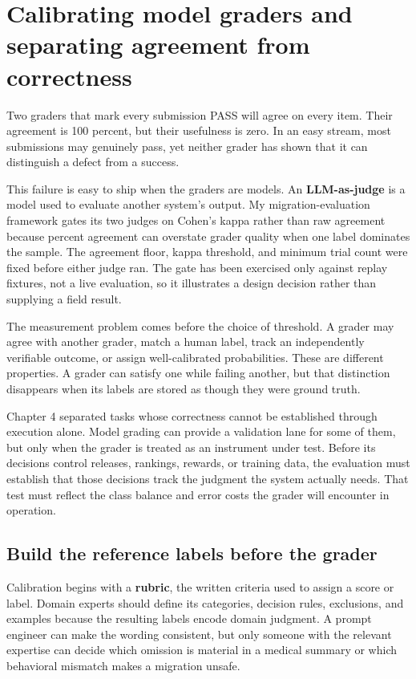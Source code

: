\chapter{Calibrating model graders and separating agreement from correctness}
\label{ch05-calibrating-model-graders-agreement-correctness}
Two graders that mark every submission PASS will agree on every item. Their agreement is 100 percent, but their usefulness is zero. In an easy stream, most submissions may genuinely pass, yet neither grader has shown that it can distinguish a defect from a success.

This failure is easy to ship when the graders are models. An \textbf{LLM-as-judge} is a model used to evaluate another system's output. My migration-evaluation framework gates its two judges on Cohen's kappa rather than raw agreement because percent agreement can overstate grader quality when one label dominates the sample. The agreement floor, kappa threshold, and minimum trial count were fixed before either judge ran. The gate has been exercised only against replay fixtures, not a live evaluation, so it illustrates a design decision rather than supplying a field result.

The measurement problem comes before the choice of threshold. A grader may agree with another grader, match a human label, track an independently verifiable outcome, or assign well-calibrated probabilities. These are different properties. A grader can satisfy one while failing another, but that distinction disappears when its labels are stored as though they were ground truth.

Chapter 4 separated tasks whose correctness cannot be established through execution alone. Model grading can provide a validation lane for some of them, but only when the grader is treated as an instrument under test. Before its decisions control releases, rankings, rewards, or training data, the evaluation must establish that those decisions track the judgment the system actually needs. That test must reflect the class balance and error costs the grader will encounter in operation.

\section{Build the reference labels before the grader}\label{build-the-reference-labels-before-the-grader}

Calibration begins with a \textbf{rubric}, the written criteria used to assign a score or label. Domain experts should define its categories, decision rules, exclusions, and examples because the resulting labels encode domain judgment. A prompt engineer can make the wording consistent, but only someone with the relevant expertise can decide which omission is material in a medical summary or which behavioral mismatch makes a migration unsafe.

